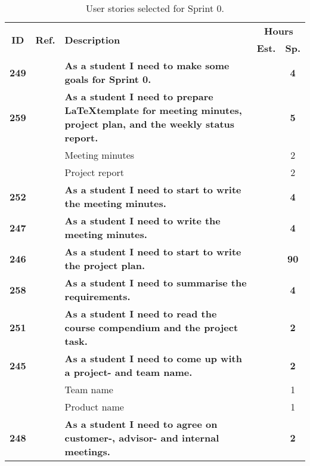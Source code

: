 \begin{table*}[!ht]
\caption{User stories selected for Sprint 0. }
\label{tab:sprint0stories}
\def\arraystretch{1.25}
\begin{tabularx}{\textwidth}{ccXcc} 
\toprule[1mm]

\multirow{2}{*}{\textbf{ID}} &
\multirow{2}{*}{\textbf{Ref.}} & \multirow{2}{*}{\textbf{Description}} & \multicolumn{2}{c}{\textbf{Hours}} \\
 					& & & \textbf{Est.} & \textbf{Sp.} \\

\midrule
\textbf{249} 	&
	& \textbf{As a student I need to make some goals for Sprint 0.} 						& 			& \textbf{4} \\
\textbf{259} 	& 
	& {\bf As a student I need to prepare \LaTeX template for meeting minutes, project plan, and the weekly status report.} 	
	& 			
	& \textbf{5} \\
		& & \hspace{2em} Meeting minutes	&  & 2 \\
		& & \hspace{2em} Project report 	&  & 2 \\
\textbf{252} 	&
	& \textbf{As a student I need to start to write the meeting minutes.} 						&  			& \textbf{4} \\

\textbf{247} 	&
	& \textbf{As a student I need to write the meeting minutes.} 						&  			& \textbf{4} \\
\textbf{246} 	&
	& \textbf{As a student I need to start to write the project plan.} 						&  			& \textbf{90} \\

\textbf{258} 	&
	& \textbf{As a student I need to summarise the requirements.} 						&  			& \textbf{4} \\
\midrule
\textbf{251} 	&
	& \textbf{As a student I need to read the course compendium and the project task.} 						& 			& \textbf{2} \\
\textbf{245} 	& 
	& \textbf{As a student I need to come up with a project- and team name.} 						& 			& \textbf{2} \\
		& & \hspace{2em} Team name &  & 1 \\
		& & \hspace{2em} Product name &  & 1 \\
\textbf{248} 	&
	& \textbf{As a student I need to agree on customer-, advisor- and internal meetings.} 						& 			& \textbf{2} \\


\end{tabularx}
\end{table*}
